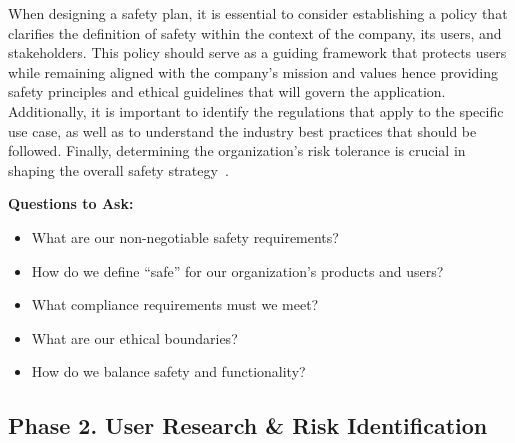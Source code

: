 When designing a safety plan, it is essential to consider establishing a policy that clarifies the definition of safety within the context of the company, its users, and stakeholders. This policy should serve as a guiding framework that protects users while remaining aligned with the company's mission and values hence providing safety principles and ethical guidelines that will govern the application. Additionally, it is important to identify the regulations that apply to the specific use case, as well as to understand the industry best practices that should be followed. Finally, determining the organization's risk tolerance is crucial in shaping the overall safety strategy~.

\textbf{Questions to Ask:}
\begin{itemize}
    \item What are our non-negotiable safety requirements?
    \item How do we define ``safe'' for our organization's products and users?
    \item What compliance requirements must we meet?
    \item What are our ethical boundaries?
    \item How do we balance safety and functionality?
\end{itemize}


\subsection{Phase 2. User Research \& Risk Identification}

